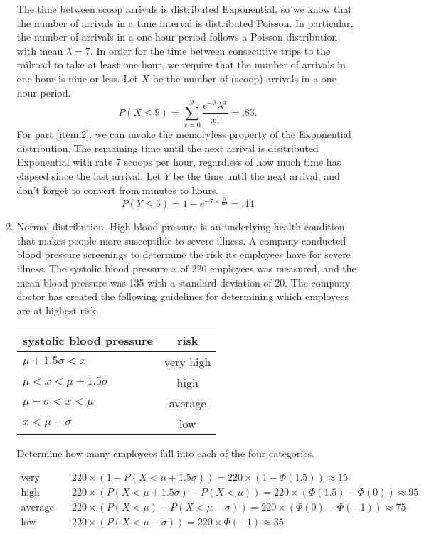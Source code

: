 \begin{enumerate}
\begin{solution}
  \bs The time between scoop arrivals is distributed Exponential, so
  we know that the number of arrivals in a time interval is
  distributed Poisson. In particular, the number of arrivals in a
  one-hour period follows a Poisson distribution with mean
  $\lambda=7$. In order for the time between consecutive trips to the
  railroad to take at least one hour, we require that the number of
  arrivals in one hour is nine or less. Let $X$ be the number of
  (scoop) arrivals in a one hour period.
\[
P(X \leq 9) = \sum_{x=0}^9 \frac{e^{-\lambda}\lambda^x}{x!} = .83.
\]
For part \ref{item:2}, we can invoke the memoryless property of the
Exponential distribution. The remaining time until the next arrival is
disitributed Exponential with rate 7 scoops per hour, regardless of how
much time has elapsed since the last arrival. Let $Y$ be the time
until the next arrival, and don't forget to convert from minutes to
hours.
\[
P(Y \leq 5) = 1 - e^{-7\times \frac{5}{60}} = .44
\]
\end{solution}

\item Normal distribution. High blood pressure is an underlying health condition that makes people more susceptible to severe illness. A company conducted blood pressure screenings to determine the risk its employees have for severe illness. The systolic blood pressure $x$ of 220 employees was measured, and the mean blood pressure was 135 with a standard deviation of 20. The company doctor has created the following guidelines for determining which employees are at highest risk.

\begin{tabular}{lc}
	systolic blood pressure & risk \\ \hline
	$\mu+1.5\sigma < x$ & very high \\
	$\mu < x < \mu+1.5\sigma$ & high \\
	$\mu-\sigma < x < \mu$ & average \\
	$x < \mu-\sigma$ & low
\end{tabular}

Determine how many employees fall into each of the four categories.

\vspace{.1in}
\begin{solution}
	\bs
	\begin{align*}
		\text{very high}&\quad 220\times(1-P(X<\mu+1.5\sigma))=220\times(1-\Phi(1.5)) \approx 15 \\
		\text{high}&\quad 
		220\times (P(X<\mu+1.5\sigma)-P(X<\mu))=220\times(\Phi(1.5)-\Phi(0)) \approx 95 \\
		\text{average}&\quad 220\times(P(X<\mu)-P(X<\mu-\sigma))=220\times(\Phi(0)-\Phi(-1))\approx 75 \\
		\text{low}&\quad 220\times(P(X<\mu-\sigma))=220\times\Phi(-1) \approx 35
	\end{align*}
\end{solution}


\end{enumerate}
